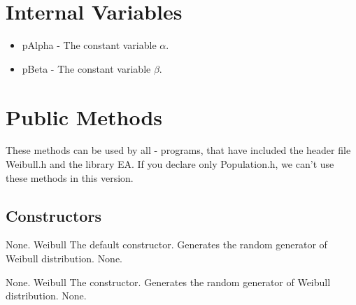 \clearpage

\section{Internal Variables}

\begin{itemize}
\item pAlpha - The constant variable $\alpha$.
\item pBeta - The constant variable $\beta$.
\end{itemize}


\vspace*{10mm}

\section{Public Methods}

\noindent
These methods can be used by all \cpp - programs, that have included the
header file Weibull.h and the library EA. If you declare only
Population.h, we can't use these methods in this version.

\subsection{Constructors}

\setNormalInstance
\setCorrectWidthThree{8pt}
\printMethodWithParamsSaved
{}
{None.}
{Weibull}
{The default constructor. Generates the random generator of Weibull distribution.}
{None.}
\setCorrectWidthThree{4pt}

\setNormalInstance
\setCorrectWidthThree{8pt}
\printMethodWithParamsSaved
{}
{None.}
{Weibull}
{The constructor. Generates the random generator of Weibull distribution.}
{None.}
\setCorrectWidthThree{4pt}


